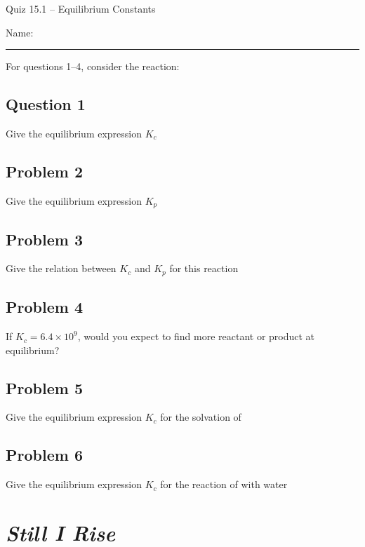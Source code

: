 \documentclass[11pt, letterpaper]{memoir}
\begin{document}
	\begin{center}
		{\large	Quiz 15.1 -- Equilibrium Constants}
	\end{center}
	{\large Name: \rule[-1mm]{4in}{.1pt} 
	
	
	\noindent	
	For questions 1--4, consider the reaction: 
	
	\subsection*{Question 1}
	Give the equilibrium expression $K_c$
	
	\vspace{3em}
	\subsection*{Problem 2}
	Give the equilibrium expression $K_p$
	
	\vspace{3em}
	\subsection*{Problem 3}
	Give the relation between $K_c$ and $K_p$ for this reaction
	
	\vspace{5em}
	\subsection*{Problem 4}
	If $K_c=6.4\times10^{9}$, would you expect to find more reactant or product at equilibrium?
	
	\vspace{3em}
	\subsection*{Problem 5}
	Give the equilibrium expression $K_c$ for the solvation of 
	
	\vspace{3em}
	\subsection*{Problem 6}
	Give the equilibrium expression $K_c$ for the reaction of  with water
	\newpage
	\pagestyle{empty}
	\addtocounter{page}{-1}
	\section*{\emph{Still I Rise}}
}
\end{document}
